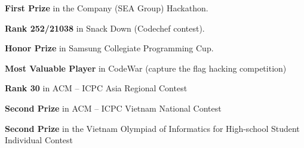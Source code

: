 \begin{cvempty} %
  \begin{cvitems} %
    \item {\textbf{First Prize} in the Company (SEA Group) Hackathon.\hfill{}}
    \item {\textbf{Rank 252/21038} in Snack Down (Codechef contest).\hfill{}}
    \item {\textbf{Honor Prize} in Samsung Collegiate Programming Cup.\hfill{}}
    \item {\textbf{Most Valuable Player} in CodeWar (capture the flag hacking competition)\hfill{}}
    \item {\textbf{Rank 30} in ACM – ICPC Asia Regional Contest\hfill{}}
    \item {\textbf{Second Prize} in ACM – ICPC Vietnam National Contest\hfill{}}
    \item {\textbf{Second Prize} in the Vietnam Olympiad of Informatics for High-school Student Individual Contest\hfill{}}
  \end{cvitems}

\end{cvempty}

